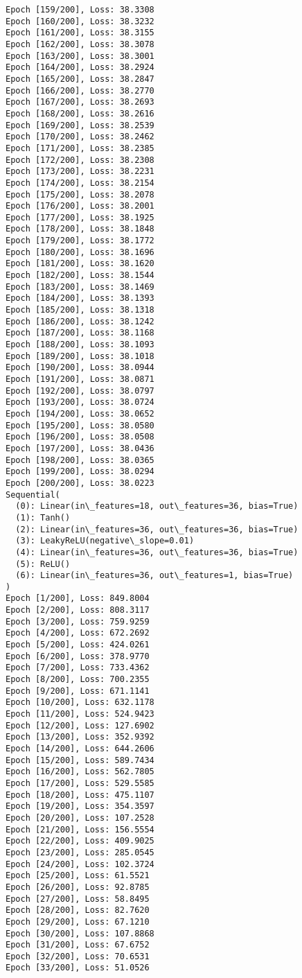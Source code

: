 \documentclass[11pt]{article}
\begin{document}
\begin{Verbatim}[commandchars=\\\{\}]
Epoch [159/200], Loss: 38.3308
Epoch [160/200], Loss: 38.3232
Epoch [161/200], Loss: 38.3155
Epoch [162/200], Loss: 38.3078
Epoch [163/200], Loss: 38.3001
Epoch [164/200], Loss: 38.2924
Epoch [165/200], Loss: 38.2847
Epoch [166/200], Loss: 38.2770
Epoch [167/200], Loss: 38.2693
Epoch [168/200], Loss: 38.2616
Epoch [169/200], Loss: 38.2539
Epoch [170/200], Loss: 38.2462
Epoch [171/200], Loss: 38.2385
Epoch [172/200], Loss: 38.2308
Epoch [173/200], Loss: 38.2231
Epoch [174/200], Loss: 38.2154
Epoch [175/200], Loss: 38.2078
Epoch [176/200], Loss: 38.2001
Epoch [177/200], Loss: 38.1925
Epoch [178/200], Loss: 38.1848
Epoch [179/200], Loss: 38.1772
Epoch [180/200], Loss: 38.1696
Epoch [181/200], Loss: 38.1620
Epoch [182/200], Loss: 38.1544
Epoch [183/200], Loss: 38.1469
Epoch [184/200], Loss: 38.1393
Epoch [185/200], Loss: 38.1318
Epoch [186/200], Loss: 38.1242
Epoch [187/200], Loss: 38.1168
Epoch [188/200], Loss: 38.1093
Epoch [189/200], Loss: 38.1018
Epoch [190/200], Loss: 38.0944
Epoch [191/200], Loss: 38.0871
Epoch [192/200], Loss: 38.0797
Epoch [193/200], Loss: 38.0724
Epoch [194/200], Loss: 38.0652
Epoch [195/200], Loss: 38.0580
Epoch [196/200], Loss: 38.0508
Epoch [197/200], Loss: 38.0436
Epoch [198/200], Loss: 38.0365
Epoch [199/200], Loss: 38.0294
Epoch [200/200], Loss: 38.0223
Sequential(
  (0): Linear(in\_features=18, out\_features=36, bias=True)
  (1): Tanh()
  (2): Linear(in\_features=36, out\_features=36, bias=True)
  (3): LeakyReLU(negative\_slope=0.01)
  (4): Linear(in\_features=36, out\_features=36, bias=True)
  (5): ReLU()
  (6): Linear(in\_features=36, out\_features=1, bias=True)
)
Epoch [1/200], Loss: 849.8004
Epoch [2/200], Loss: 808.3117
Epoch [3/200], Loss: 759.9259
Epoch [4/200], Loss: 672.2692
Epoch [5/200], Loss: 424.0261
Epoch [6/200], Loss: 378.9770
Epoch [7/200], Loss: 733.4362
Epoch [8/200], Loss: 700.2355
Epoch [9/200], Loss: 671.1141
Epoch [10/200], Loss: 632.1178
Epoch [11/200], Loss: 524.9423
Epoch [12/200], Loss: 127.6902
Epoch [13/200], Loss: 352.9392
Epoch [14/200], Loss: 644.2606
Epoch [15/200], Loss: 589.7434
Epoch [16/200], Loss: 562.7805
Epoch [17/200], Loss: 529.5585
Epoch [18/200], Loss: 475.1107
Epoch [19/200], Loss: 354.3597
Epoch [20/200], Loss: 107.2528
Epoch [21/200], Loss: 156.5554
Epoch [22/200], Loss: 409.9025
Epoch [23/200], Loss: 285.0545
Epoch [24/200], Loss: 102.3724
Epoch [25/200], Loss: 61.5521
Epoch [26/200], Loss: 92.8785
Epoch [27/200], Loss: 58.8495
Epoch [28/200], Loss: 82.7620
Epoch [29/200], Loss: 67.1210
Epoch [30/200], Loss: 107.8868
Epoch [31/200], Loss: 67.6752
Epoch [32/200], Loss: 70.6531
Epoch [33/200], Loss: 51.0526

\end{Verbatim}
\end{document}
